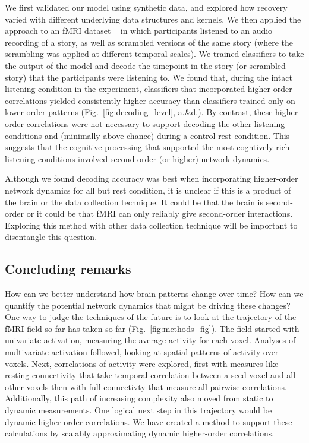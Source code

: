 We first validated our model using synthetic data, and explored how recovery
varied with different underlying data structures and kernels. We then applied
the approach to an fMRI dataset ~\citep{SimoEtal16} in which participants
listened to an audio recording of a story, as well as scrambled versions of the
same story (where the scrambling was applied at different temporal scales). We
trained classifiers to take the output of the model and decode the timepoint in
the story (or scrambled story) that the participants were listening to. We
found that, during the intact listening condition in the experiment,
classifiers that incorporated higher-order correlations yielded consistently
higher accuracy than classifiers trained only on lower-order patterns
(Fig.~\ref{fig:decoding_level}, a.\&d.). By contrast, these higher-order
correlations were not necessary to support decoding the other listening
conditions and (minimally above chance) during a control rest condition. This
suggests that the cognitive processing that supported the most cogntively rich
listening conditions involved second-order (or higher) network dynamics.

Although we found decoding accuracy was best when incorporating higher-order
network dynamics for all but rest condition, it is unclear if this is a product
of the brain or the data collection technique. It could be that the brain is
second-order or it could be that fMRI can only reliably give second-order
interactions. Exploring this method with other data collection technique will
be important to disentangle this question.



  \subsection*{Concluding remarks}

How can we better understand how brain patterns change over
time? How can we quantify the potential network dynamics that might be
driving these changes? One way to judge the techniques of the future is
to look at the trajectory of the fMRI field so far has taken so far
(Fig.~\ref{fig:methods_fig}).  The field started with 
univariate activation, measuring the average activity for each voxel.
Analyses of multivariate activation followed, looking at spatial patterns of
activity over voxels. Next, correlations of activity were explored, first
with measures like resting connectivity that take temporal correlation
between a seed voxel and all other voxels then with full connectivty
that measure all pairwise correlations.  Additionally, this path of increasing
complexity also moved from static to dynamic measurements.  One
logical next step in this trajectory would be dynamic higher-order
correlations. We have created a method 
to support these calculations by scalably approximating dynamic higher-order
correlations.  









